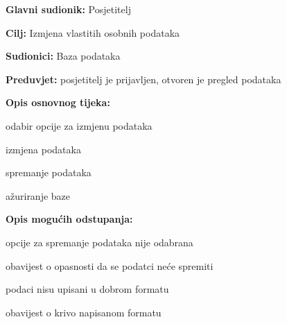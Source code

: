 					\noindent {}
					\begin{packed_item}
	
						\item \textbf{Glavni sudionik: }Posjetitelj
						\item  \textbf{Cilj:} Izmjena vlastitih osobnih podataka
						\item  \textbf{Sudionici:} Baza podataka
						\item  \textbf{Preduvjet:} posjetitelj je prijavljen, otvoren je pregled podataka
						\item  \textbf{Opis osnovnog tijeka:}
						
						\item[] \begin{packed_enum}
	
							\item odabir opcije za izmjenu podataka
							\item izmjena podataka
							\item spremanje podataka 
							\item ažuriranje baze
							
						\end{packed_enum}
						
						\item  \textbf{Opis mogućih odstupanja:}
						
						\item[] \begin{packed_item}
	
							\item[3.a] opcije za spremanje podataka nije odabrana
							\item[] \begin{packed_enum}
								
								\item obavijest o opasnosti da se podatci neće spremiti
								
							\end{packed_enum}
							\item[3.b] podaci nisu upisani u dobrom formatu
							\item[] \begin{packed_enum}
								
								\item obavijest o krivo napisanom formatu
								
							\end{packed_enum}
						
							
						\end{packed_item}
					\end{packed_item}
					

